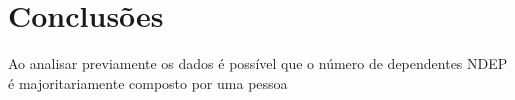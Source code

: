 \documentclass[journal, a4paper]{IEEEtran}
\begin{document}
\section{Conclusões}
	Ao analisar previamente os dados é possível que o número de dependentes NDEP é majoritariamente composto por uma pessoa







\end{document}
